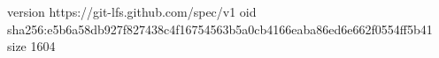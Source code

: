 version https://git-lfs.github.com/spec/v1
oid sha256:e5b6a58db927f827438c4f16754563b5a0cb4166eaba86ed6e662f0554ff5b41
size 1604
